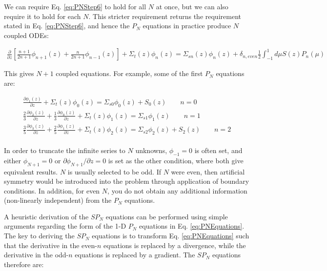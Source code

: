 \documentclass[10pt]{article}
\begin{document}
We can require Eq. \eqref{eq:PNStep6} to hold for all \(N\) at once, but we can also require it to hold for each \(N\). This stricter requirement returns the requirement stated in Eq. \eqref{eq:PNStep6}, and hence the \(P_N\) equations in practice produce \(N\) coupled ODEs:

\begin{equation}
\label{eq:PNEquations}
\begin{aligned}
\frac{\partial}{\partial z}\left\lbrack\frac{n+1}{2n+1}\phi_{n+1}(z) +\frac{n}{2n+1} \phi_{n-1}(z)\right\rbrack + \Sigma_t(z)\phi_n(z) =
\Sigma_{sn}(z)\phi_n(z) +  \delta_{n,even}\frac{1}{2}\int_{-1}^{1}d\mu S(z)P_n(\mu)
 \end{aligned}
 \end{equation}

This gives \(N+1\) coupled equations. For example, some of the first \(P_N\) equations are:
 
 \begin{equation}
 \begin{aligned}
\frac{\partial\phi_{1}(z)}{\partial z} + \Sigma_t(z)\phi_0(z)=\Sigma_{s0}\phi_0(z)+ S_0(z)\quad\quad n=0\\
\frac{2}{3}\frac{\partial\phi_{2}(z)}{\partial z}+\frac{1}{3}\frac{\partial\phi_{0}(z)}{\partial z} + \Sigma_t(z)\phi_1(z)=\Sigma_{s1}\phi_1(z)\quad\quad n=1\\
\frac{3}{5}\frac{\partial\phi_{3}(z)}{\partial z}+\frac{2}{5}\frac{\partial\phi_{1}(z)}{\partial z} + \Sigma_t(z)\phi_2(z)=\Sigma_{s2}\phi_2(z)+ S_2(z)\quad\quad n=2\\
\end{aligned}
\end{equation}

In order to truncate the infinite series to \(N\) unknowns, \(\phi_{-1}=0\) is often set, and either \(\phi_{N+1}=0\) or \(\partial\phi_{N+1}/\partial z=0\) is set as the other condition, where both give equivalent results. \(N\) is usually selected to be odd. If \(N\) were even, then artificial symmetry would be introduced into the problem through application of boundary conditions. In addition, for even \(N\), you do not obtain any additional information (non-linearly independent) from the \(P_N\) equations.

A heuristic derivation of the \(SP_N\) equations can be performed using simple arguments regarding the form of the 1-D \(P_N\) equations in Eq. \eqref{eq:PNEquations}. The key to deriving the \(SP_N\) equations is to transform Eq. \eqref{eq:PNEquations} such that the derivative in the even-\(n\) equations is replaced by a divergence, while the derivative in the odd-\(n\) equations is replaced by a gradient. The \(SP_N\) equations therefore are:
\end{document}
